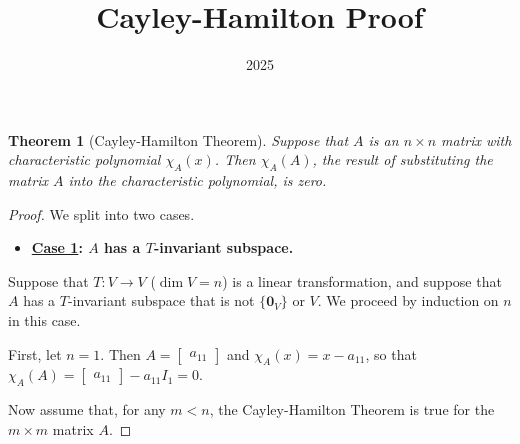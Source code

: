 \documentclass{report}
\title{Cayley-Hamilton Proof}
\author{}
\date{2025}
\newcommand{\set}[1]{\{ #1 \}}
\renewcommand{\vec}[1]{\mathbf{#1}}
\newtheorem{theorem}{Theorem}[section]
\begin{document}
        \begin{theorem}[Cayley-Hamilton Theorem]
            Suppose that $A$ is an $n \times n$ matrix with characteristic polynomial $\chi_A (x)$.
            Then $\chi_A (A)$, the result of substituting the matrix $A$ into the characteristic
            polynomial, is zero.
        \end{theorem}
        \begin{proof}
            We split into two cases.
            \begin{itemize}
                \item \textbf{\ul{Case 1}: $A$ has a $T$-invariant subspace.}
            \end{itemize}
            Suppose that $T:V \rightarrow V$ ($\dim{V} = n$) is a linear transformation, and suppose that $A$
            has a $T$-invariant subspace that is not $\set{\vec{0}_V}$ or $V$. We proceed by induction
            on $n$ in this case.
            
            First, let $n = 1$. Then $A = \begin{bmatrix} a_{11} \end{bmatrix}$ and $\chi_A (x) = x - a_{11}$,
            so that $\chi_A (A) = \begin{bmatrix} a_{11} \end{bmatrix} - a_{11} I_{1} = 0$. 

            Now assume that, for any $m < n$, the Cayley-Hamilton Theorem is true for the $m \times m$ matrix $A$.


\end{proof}
\end{document}
